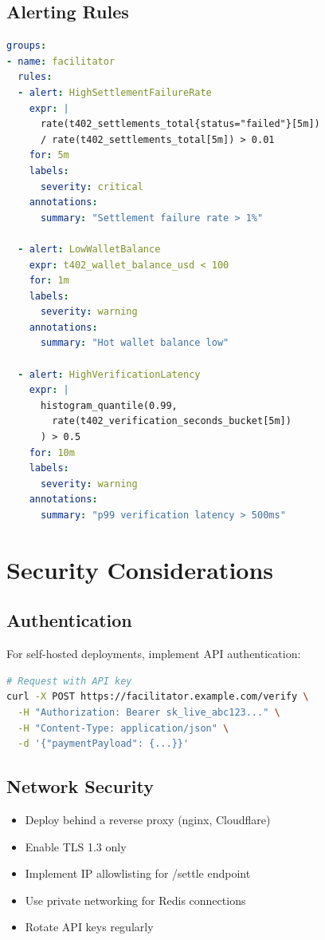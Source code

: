 \subsection{Alerting Rules}

\begin{lstlisting}[language=yaml,caption={Prometheus alerting rules}]
groups:
- name: facilitator
  rules:
  - alert: HighSettlementFailureRate
    expr: |
      rate(t402_settlements_total{status="failed"}[5m])
      / rate(t402_settlements_total[5m]) > 0.01
    for: 5m
    labels:
      severity: critical
    annotations:
      summary: "Settlement failure rate > 1%"

  - alert: LowWalletBalance
    expr: t402_wallet_balance_usd < 100
    for: 1m
    labels:
      severity: warning
    annotations:
      summary: "Hot wallet balance low"

  - alert: HighVerificationLatency
    expr: |
      histogram_quantile(0.99,
        rate(t402_verification_seconds_bucket[5m])
      ) > 0.5
    for: 10m
    labels:
      severity: warning
    annotations:
      summary: "p99 verification latency > 500ms"
\end{lstlisting}

\section{Security Considerations}
\label{sec:facilitator-security}

\subsection{Authentication}

For self-hosted deployments, implement API authentication:

\begin{lstlisting}[language=bash,caption={API key authentication}]
# Request with API key
curl -X POST https://facilitator.example.com/verify \
  -H "Authorization: Bearer sk_live_abc123..." \
  -H "Content-Type: application/json" \
  -d '{"paymentPayload": {...}}'
\end{lstlisting}

\subsection{Network Security}

\begin{itemize}
    \item Deploy behind a reverse proxy (nginx, Cloudflare)
    \item Enable TLS 1.3 only
    \item Implement IP allowlisting for /settle endpoint
    \item Use private networking for Redis connections
    \item Rotate API keys regularly
\end{itemize}

